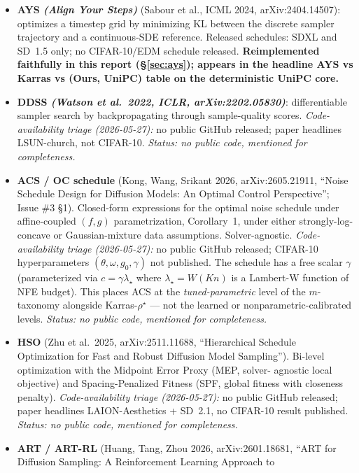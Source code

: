 \documentclass[11pt]{article}
\begin{document}
\begin{itemize}
\item \textbf{AYS \emph{(Align Your Steps)}} (Sabour et al., ICML 2024,
  arXiv:2404.14507): optimizes a timestep grid by minimizing KL between
  the discrete sampler trajectory and a continuous-SDE reference.
  Released schedules: SDXL and SD~1.5 only; no CIFAR-10/EDM schedule
  released. \textbf{Reimplemented faithfully in this report
  (\S\ref{sec:ays}); appears in the headline AYS vs Karras vs
  (Ours, UniPC) table on the deterministic UniPC core.}
\item \textbf{DDSS \emph{(Watson et al.\ 2022, ICLR, arXiv:2202.05830)}}:
  differentiable sampler search by backpropagating through sample-quality
  scores. \emph{Code-availability triage (2026-05-27):} no public GitHub
  released; paper headlines LSUN-church, not CIFAR-10.
  \emph{Status: no public code, mentioned for completeness.}
\item \textbf{ACS / OC schedule}
  (Kong, Wang, Srikant 2026, arXiv:2605.21911, ``Noise Schedule Design
  for Diffusion Models: An Optimal Control Perspective''; Issue \#3
  \S1). Closed-form expressions for the optimal noise schedule under
  affine-coupled \((f,g)\) parametrization, Corollary~1, under either
  strongly-log-concave or Gaussian-mixture data assumptions.
  Solver-agnostic. \emph{Code-availability triage (2026-05-27):} no
  public GitHub released; CIFAR-10 hyperparameters \((\theta,\omega,g_0,\gamma)\)
  not published. The schedule has a free scalar \(\gamma\) (parameterized
  via \(c = \gamma \lambda_\star\) where \(\lambda_\star = W(Kn)\) is a
  Lambert-W function of NFE budget). This places ACS at the
  \emph{tuned-parametric} level of the \(m\)-taxonomy alongside
  Karras-\(\rho^\star\) --- not the learned or nonparametric-calibrated
  levels. \emph{Status: no public code, mentioned for completeness.}
\item \textbf{HSO} (Zhu et al.\ 2025, arXiv:2511.11688, ``Hierarchical
  Schedule Optimization for Fast and Robust Diffusion Model Sampling'').
  Bi-level optimization with the Midpoint Error Proxy (MEP, solver-
  agnostic local objective) and Spacing-Penalized Fitness (SPF, global
  fitness with closeness penalty). \emph{Code-availability triage
  (2026-05-27):} no public GitHub released; paper headlines
  LAION-Aesthetics + SD~2.1, no CIFAR-10 result published.
  \emph{Status: no public code, mentioned for completeness.}
\item \textbf{ART / ART-RL} (Huang, Tang, Zhou 2026, arXiv:2601.18681,
  ``ART for Diffusion Sampling: A Reinforcement Learning Approach to

\end{itemize}
\end{document}
